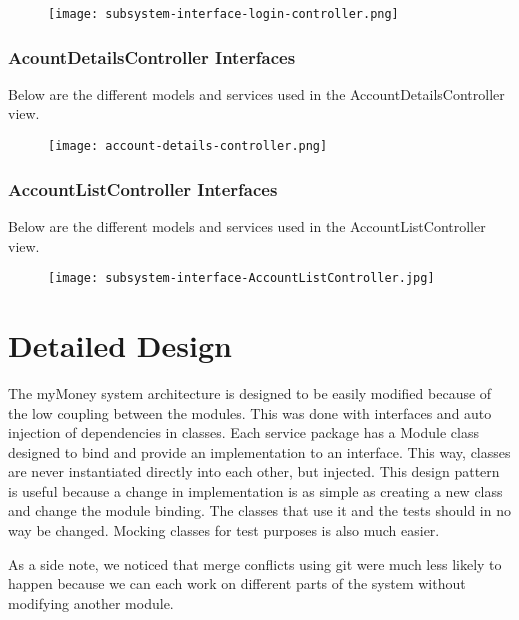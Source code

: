 \documentclass[12pt]{article}
\begin{document}
\begin{figure}[H]
\texttt{[image: subsystem-interface-login-controller.png]}
\end{figure}

\clearpage

\subsubsection{AcountDetailsController Interfaces}

Below are the different models and services used in the AccountDetailsController view.

\begin{figure}[H]
\texttt{[image: account-details-controller.png]}
\end{figure}

\clearpage

\subsubsection{AccountListController Interfaces}

Below are the different models and services used in the AccountListController view.

\begin{figure}[H]
\texttt{[image: subsystem-interface-AccountListController.jpg]}
\end{figure}

\clearpage

\section{Detailed Design} \label{sec:detail}

The myMoney system architecture is designed to be easily modified because of the low coupling between the modules. This was done with interfaces and auto injection of dependencies in classes. Each service package has a Module class designed to bind and provide an implementation to an interface. This way, classes are never instantiated directly into each other, but injected. This design pattern is useful because a change in implementation is as simple as creating a new class and change the module binding. The classes that use it and the tests should in no way be changed. Mocking classes for test purposes is also much easier.

As a side note, we noticed that merge conflicts using git were much less likely to happen because we can each work on different parts of the system without modifying another module.
\end{document}
